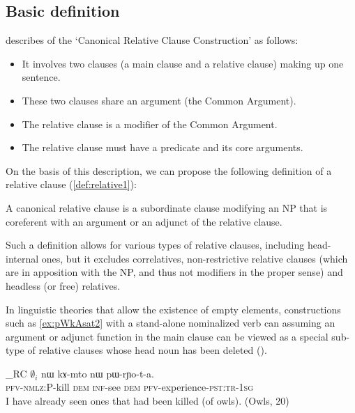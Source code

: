 \documentclass[oldfontcommands,oneside,a4paper,11pt]{article}
\newcommand{\ipa}[1]{{\phon #1}} %
\newcommand{\topic}{\textsc{dem}}
\begin{document}
\subsection{Basic definition}
 \citet[314]{dixon10basic2}  describes of the `Canonical Relative Clause Construction' as follows:
 
\begin{itemize}
\item It involves two clauses (a main clause and a relative clause) making up one sentence. 
\item These two clauses share an argument (the Common Argument). 
\item The relative clause is a modifier of the Common Argument. 
\item The relative clause must have a predicate and its core arguments. 
\end{itemize}

On the basis of this description, we can propose  the following definition of a relative clause (\ref{def:relative1}):

\begin{exe}
\ex \label{def:relative1}
\glt A canonical relative clause is  a subordinate clause modifying an NP    that is coreferent with an argument or an adjunct of the relative clause. 
\end{exe}
 
Such a definition allows for various types of relative clauses, including head-internal ones, but it excludes correlatives, non-restrictive relative clauses (which are in apposition with the NP, and thus not modifiers in the proper sense) and headless (or free) relatives.

In linguistic theories that  allow the existence of empty elements, constructions such as \ref{ex:pWkAsat2} with a stand-alone nominalized verb can assuming an argument or adjunct function in the main clause can be viewed as a special sub-type of relative clauses whose head noun has been deleted (\citealt[197-205]{dryer07noun.phrase}). 


   \begin{exe}
\ex \label{ex:pWkAsat2}
\gll [$\emptyset_i$ \ipa{pɯ-kɤ-sat}]_{RC}  $\emptyset_i$ 	\ipa{nɯ}  	\ipa{kɤ-mto}  	\ipa{nɯ}  	\ipa{pɯ-rɲo-t-a.}  \\
{ }  \textsc{pfv-nmlz:P}-kill { } \topic{} \textsc{inf}-see \topic{} \textsc{pfv}-experience-\textsc{pst:tr-1sg} \\
\glt I have already seen ones that had been killed (of owls). (Owls, 20)
  \end{exe}
\end{document}
